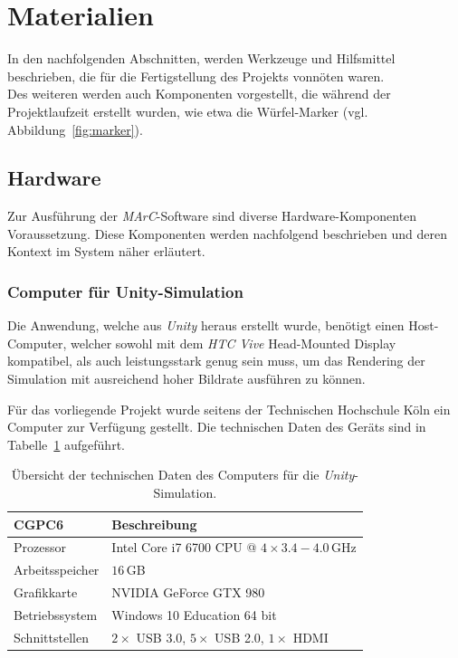 \section{Materialien}\label{sec:Materialien}
In den nachfolgenden Abschnitten, werden Werkzeuge und Hilfsmittel beschrieben, die für die Fertigstellung des Projekts vonnöten waren.\\ Des weiteren werden auch Komponenten vorgestellt, die während der Projektlaufzeit erstellt wurden, wie etwa die Würfel-Marker (vgl. Abbildung~\ref{fig:marker}).

\subsection{Hardware}
Zur Ausführung der \emph{MArC}-Software sind diverse Hardware-Komponenten Voraussetzung. Diese Komponenten werden nachfolgend beschrieben und deren Kontext im System näher erläutert.

\subsubsection{Computer für Unity-Simulation}\label{sec:UnityComp}%
Die Anwendung, welche aus \textit{Unity} \cite{website:Unity} heraus erstellt wurde, benötigt einen Host-Computer, welcher sowohl mit dem \textit{HTC Vive} Head-Mounted Display kompatibel, als auch leistungsstark genug sein muss, um das Rendering der Simulation mit ausreichend hoher Bildrate ausführen zu können.

Für das vorliegende Projekt wurde seitens der Technischen Hochschule Köln ein Computer zur Verfügung gestellt. Die technischen Daten des Geräts sind in Tabelle~\ref{tab:UnityCompParam} aufgeführt.

\begin{table}
	\centering
	\begin{tabular}{|l|l|}
		\hline
		\Absatzbox{}
		\textbf{CGPC6}& \textbf{Beschreibung} \\
		\hline
		Prozessor & Intel Core i7 6700 CPU @ $4\times3.4-4.0\,$GHz \\
		\hline
		Arbeitsspeicher & $16\,$GB \\
 		\hline 
		Grafikkarte & NVIDIA GeForce GTX 980\\
		\hline
		Betriebssystem & Windows 10 Education 64 bit \\
		\hline
		Schnittstellen & $2\times$ USB 3.0, $5\times$ USB 2.0, $1\times $ HDMI\\
		\hline
	\end{tabular}
	\caption[Übersicht technische Daten des Computers für \emph{Unity}-Simulation]{Übersicht der technischen Daten des Computers für die \emph{Unity}-Simulation.}
	\label{tab:UnityCompParam}
\end{table}

